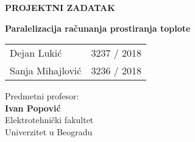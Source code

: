 	
\thispagestyle{empty}
\noindent
\noindent
\begin{center}
	\textup{\small {\bf PROJEKTNI ZADATAK}}\\[0.2in]
	\vspace{3in}

	
	
	\Large {\textbf {Paralelizacija računanja prostiranja toplote }}\\[2in]
	

	\vspace{1in}
	\begin{table}[h]
		\centering
		\begin{tabular}{lr}
			Dejan Lukić & 3237 / 2018 \\
			Sanja Mihajlović & 3236 / 2018 \\
		\end{tabular}
	\end{table}
	
	\vspace{0.1in}
	Predmetni profesor:\\
	{\textbf{Ivan Popović}}\\

	\vspace{1in}	
		\Large{Elektrotehni\v cki fakultet}\\
	\normalsize
	Univerzitet u Beogradu \\
	

	
	\vfill
	
\end{center}

\pagebreak